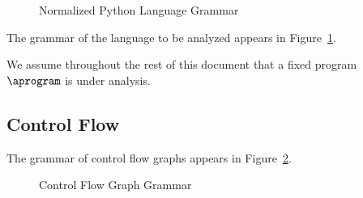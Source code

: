 \documentclass{article}
\begin{document}
    \begin{figure}\center
        \begin{grammar}

        \end{grammar}
        \caption{Normalized Python Language Grammar}
        \label{fig_languageGrammar}
    \end{figure}

    The grammar of the language to be analyzed appears in Figure~\ref{fig_languageGrammar}.

    We assume throughout the rest of this document that a fixed program $\aprogram$ is under analysis.  

    \subsection{Control Flow}

    The grammar of control flow graphs appears in Figure~\ref{fig_cfgGrammar}.  

    \begin{figure}\center
        \begin{grammar}
        \end{grammar}
        \caption{Control Flow Graph Grammar}
        \label{fig_cfgGrammar}
    \end{figure}
\end{document}
